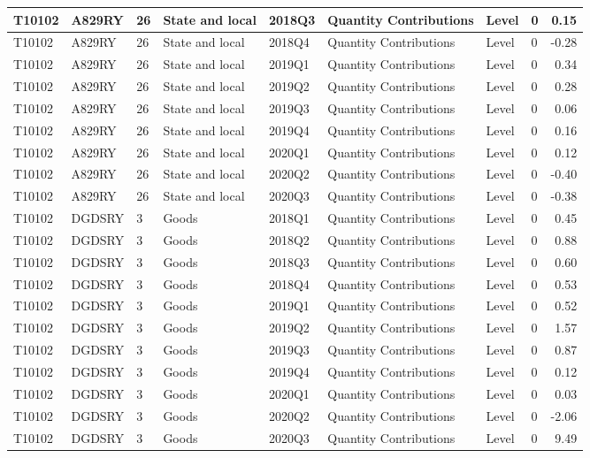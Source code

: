 \documentclass[
]{article}
\begin{document}
\begin{tabular}{l|l|l|l|l|l|l|l|r}
\hline
T10102 & A829RY & 26 & State and local & 2018Q3 & Quantity Contributions & Level & 0 & 0.15\\
\hline
T10102 & A829RY & 26 & State and local & 2018Q4 & Quantity Contributions & Level & 0 & -0.28\\
\hline
T10102 & A829RY & 26 & State and local & 2019Q1 & Quantity Contributions & Level & 0 & 0.34\\
\hline
T10102 & A829RY & 26 & State and local & 2019Q2 & Quantity Contributions & Level & 0 & 0.28\\
\hline
T10102 & A829RY & 26 & State and local & 2019Q3 & Quantity Contributions & Level & 0 & 0.06\\
\hline
T10102 & A829RY & 26 & State and local & 2019Q4 & Quantity Contributions & Level & 0 & 0.16\\
\hline
T10102 & A829RY & 26 & State and local & 2020Q1 & Quantity Contributions & Level & 0 & 0.12\\
\hline
T10102 & A829RY & 26 & State and local & 2020Q2 & Quantity Contributions & Level & 0 & -0.40\\
\hline
T10102 & A829RY & 26 & State and local & 2020Q3 & Quantity Contributions & Level & 0 & -0.38\\
\hline
T10102 & DGDSRY & 3 & Goods & 2018Q1 & Quantity Contributions & Level & 0 & 0.45\\
\hline
T10102 & DGDSRY & 3 & Goods & 2018Q2 & Quantity Contributions & Level & 0 & 0.88\\
\hline
T10102 & DGDSRY & 3 & Goods & 2018Q3 & Quantity Contributions & Level & 0 & 0.60\\
\hline
T10102 & DGDSRY & 3 & Goods & 2018Q4 & Quantity Contributions & Level & 0 & 0.53\\
\hline
T10102 & DGDSRY & 3 & Goods & 2019Q1 & Quantity Contributions & Level & 0 & 0.52\\
\hline
T10102 & DGDSRY & 3 & Goods & 2019Q2 & Quantity Contributions & Level & 0 & 1.57\\
\hline
T10102 & DGDSRY & 3 & Goods & 2019Q3 & Quantity Contributions & Level & 0 & 0.87\\
\hline
T10102 & DGDSRY & 3 & Goods & 2019Q4 & Quantity Contributions & Level & 0 & 0.12\\
\hline
T10102 & DGDSRY & 3 & Goods & 2020Q1 & Quantity Contributions & Level & 0 & 0.03\\
\hline
T10102 & DGDSRY & 3 & Goods & 2020Q2 & Quantity Contributions & Level & 0 & -2.06\\
\hline
T10102 & DGDSRY & 3 & Goods & 2020Q3 & Quantity Contributions & Level & 0 & 9.49\\

\end{tabular}
\end{document}
